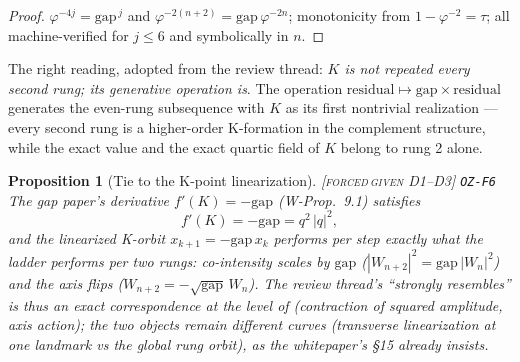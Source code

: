 \documentclass[11pt]{article}
\newcommand{\tagFD}{\textcolor{cF}{\textsc{[forced}}\,\textcolor{cD}{\textsc{given D1--D3]}}}
\newcommand{\hx}[1]{\textcolor{cC}{\footnotesize\texttt{#1}}}
\newcommand{\gp}{\varphi}
\newcommand{\gapc}{\mathrm{gap}}
\theoremstyle{plain}
\newtheorem{proposition}[theorem]{Proposition}
\theoremstyle{definition}
\theoremstyle{remark}
\begin{document}
\begin{proof}
$\gp^{-4j}=\gapc^{\,j}$ and $\gp^{-2(n+2)}=\gapc\,\gp^{-2n}$; monotonicity from
$1-\gp^{-2}=\tau$; all machine-verified for $j\le6$ and symbolically in $n$.
\end{proof}

The right reading, adopted from the review thread: \emph{$K$ is not repeated
every second rung; its generative operation is}. The operation
$\text{residual}\mapsto\gapc\times\text{residual}$ generates the even-rung
subsequence with $K$ as its first nontrivial realization --- every second rung is
a higher-order K-formation in the complement structure, while the exact value and
the exact quartic field of $K$ belong to rung 2 alone.

\begin{proposition}[Tie to the K-point linearization]\label{prop:linearization}\tagFD{} \hx{OZ-F6}
The gap paper's derivative $f'(K)=-\gapc$ (W-Prop.\ 9.1) satisfies
\[
f'(K)=-\gapc=q^2\,|q|^2 ,
\]
and the linearized K-orbit $x_{k+1}=-\gapc\,x_k$ performs per step exactly what
the ladder performs per two rungs: co-intensity scales by $\gapc$
($|W_{n+2}|^2=\gapc\,|W_n|^2$) and the axis flips ($W_{n+2}=-\sqrt{\gapc}\,W_n$).
The review thread's ``strongly resembles'' is thus an exact correspondence at the
level of (contraction of squared amplitude, axis action); the two objects remain
different curves (transverse linearization at one landmark vs the global rung
orbit), as the whitepaper's \S15 already insists.
\end{proposition}
\end{document}

